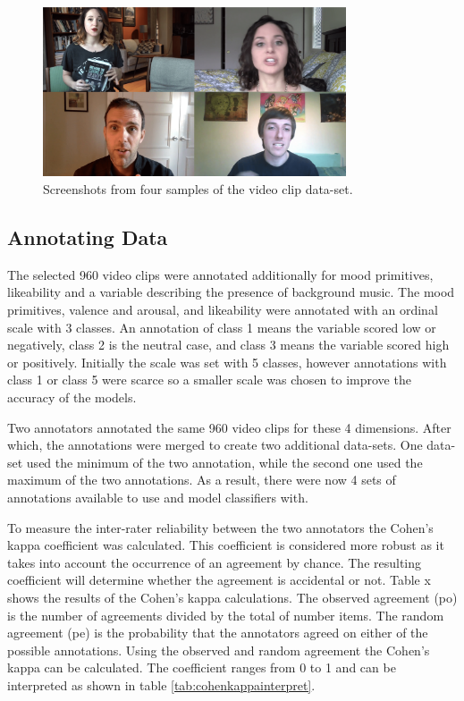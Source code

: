 \begin{figure}[h]
  \centering
  \includegraphics[width=0.8\textwidth]{Images/sample_video_clips-min.png}
  \caption{Screenshots from four samples of the video clip data-set.}
  \label{fig:ssvideoclip}
\end{figure}


\subsection{Annotating Data}
\label{subsection:annotatingdata}
The selected 960 video clips were annotated additionally for mood primitives, likeability and a variable describing the presence of background music. The mood primitives, valence and arousal, and likeability were annotated with an ordinal scale with 3 classes. An annotation of class 1 means the variable scored low or negatively, class 2 is the neutral case, and class 3 means the variable scored high or positively. Initially the scale was set with 5 classes, however annotations with class 1 or class 5 were scarce so a smaller scale was chosen to improve the accuracy of the models. 

Two annotators annotated the same 960 video clips for these 4 dimensions. After which, the annotations were merged to create two additional data-sets. One data-set used the minimum of the two annotation, while the second one used the maximum of the two annotations. As a result, there were now 4 sets of annotations available to use and model classifiers with.

To measure the inter-rater reliability between the two annotators the Cohen's kappa coefficient was calculated. This coefficient is considered more robust as it takes into account the occurrence of an agreement by chance. The resulting coefficient will determine whether the agreement is accidental or not. Table x shows the results of the Cohen's kappa calculations. The observed agreement (po) is the number of agreements divided by the total of number items. The random agreement (pe) is the probability that the annotators agreed on either of the possible annotations. Using the observed and random agreement the Cohen's kappa can be calculated. The coefficient ranges from 0 to 1 and can be interpreted as shown in table \ref{tab:cohenkappainterpret}.

